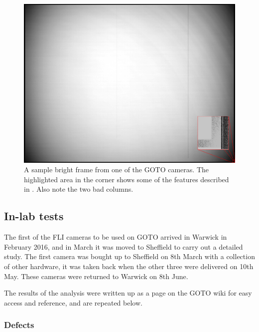 \begin{colsection}
\begin{colsection}
\begin{figure}[p]
    \begin{center}
        \includegraphics[width=\textwidth]{images/sample.png}
    \end{center}
    \caption[TODO]{
        A sample bright frame from one of the GOTO cameras. The highlighted area in the corner shows some of the features described in . Also note the two bad columns.
        }\label{fig:frame}
\end{figure}

\clearpage

\end{colsection}

\subsection{In-lab tests}
\label{sec:detector_tests}
\begin{colsection}

The first of the FLI cameras to be used on GOTO arrived in Warwick in February 2016, and in March it was moved to Sheffield to carry out a detailed study.
The first camera was bought up to Sheffield on 8th March with a collection of other hardware, it was taken back when the other three were delivered on 10th May. These cameras were returned to Warwick on 8th June.

The results of the analysis were written up as a page on the GOTO wiki for easy access and reference, and are repeated below.

\newpage
\subsubsection{Defects}


\end{colsection}
\end{colsection}
